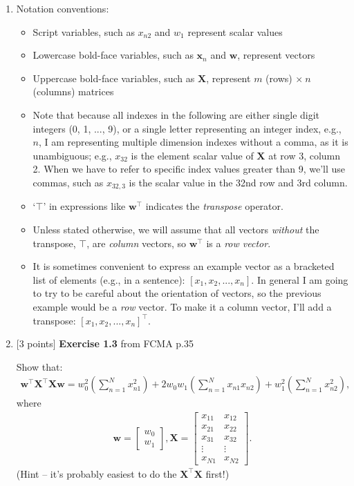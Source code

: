 \documentclass[10pt]{article}
\begin{document}
\begin{enumerate}
\item[] Notation conventions:
\begin{itemize}
\item Script variables, such as $x_{n2}$ and $w_1$ represent scalar values
\item Lowercase bold-face variables, such as $\mathbf{x}_n$ and $\mathbf{w}$, represent vectors
\item Uppercase bold-face variables, such as $\mathbf{X}$, represent $m$ (rows) $\times ~n$ (columns) matrices
\item Note that because all indexes in the following are either single digit integers (0, 1, ..., 9), or a single letter representing an integer index, e.g., $n$, I am representing multiple dimension indexes without a comma, as it is unambiguous; e.g., $x_{32}$ is the element scalar value of $\mathbf{X}$ at row 3, column 2.  When we have to refer to specific index values greater than 9, we'll use commas, such as $x_{32,3}$ is the scalar value in the 32nd row and 3rd column.
\item `$\top$' in expressions like $\mathbf{w}^\top$ indicates the {\em transpose} operator.
\item Unless stated otherwise, we will assume that all vectors {\em without} the transpose, $\top$, are {\em column} vectors, so $\mathbf{w}^\top$ is a {\em row vector}.
\item It is sometimes convenient to express an example vector as a bracketed list of elements (e.g., in a sentence): $[x_1, x_2, ..., x_n]$.  In general I am going to try to be careful about the orientation of vectors, so the previous example would be a {\em row} vector.  To make it a column vector, I'll add a transpose: $[x_1, x_2, ..., x_n]^\top$.
\end{itemize}
\vspace{1cm}




\item \label{prob:3} [3 points]
{\bf Exercise 1.3} from FCMA p.35

Show that:
\begin{eqnarray*}
\mathbf{w}^\top\mathbf{X}^\top\mathbf{X}\mathbf{w} = w_0^2 \left( \sum_{n=1}^N x_{n1}^2 \right) + 2w_0w_1 \left( \sum_{n=1}^N x_{n1}x_{n2} \right) + w_1^2 \left( \sum_{n=1}^N x_{n2}^2 \right),
\end{eqnarray*}
where
\begin{eqnarray*}
\mathbf{w} = 
    \begin{bmatrix}
    w_0 \\[0.3em]
    w_1
    \end{bmatrix}
    ,
\mathbf{X} = 
    \begin{bmatrix}
    x_{11} & x_{12} \\[0.3em]
    x_{21} & x_{22} \\[0.3em]
    x_{31} & x_{32} \\[0.3em]
    \vdots & \vdots \\[0.3em]
    x_{N1} & x_{N2}
    \end{bmatrix}
    .
\end{eqnarray*}
(Hint -- it's probably easiest to do the $\mathbf{X}^\top\mathbf{X}$ first!)


\end{enumerate}
\end{document}
